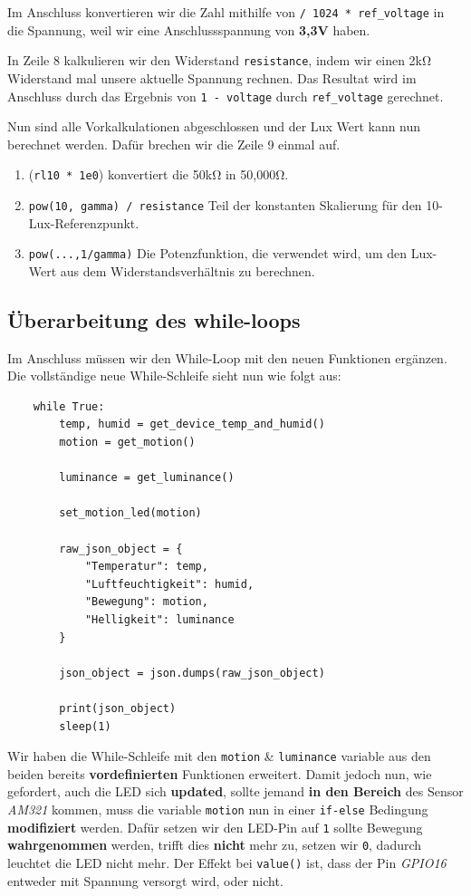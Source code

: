\documentclass[9pt,a4paper]{report}
\begin{document}
	Im Anschluss konvertieren wir die Zahl mithilfe von \texttt{/ 1024 * ref\_voltage} in die Spannung, weil wir eine Anschlussspannung von \textbf{3,3V} haben.
	
	In Zeile 8 kalkulieren wir den Widerstand \texttt{resistance}, indem wir einen 2kΩ Widerstand mal unsere aktuelle Spannung rechnen. Das Resultat wird im Anschluss durch das Ergebnis von \texttt{1 - voltage} durch \texttt{ref\_voltage} gerechnet.
	
	Nun sind alle Vorkalkulationen abgeschlossen und der Lux Wert kann nun berechnet werden. Dafür brechen wir die Zeile 9 einmal auf.
	
	\begin{enumerate}
		\item (\texttt{rl10 * 1e0}) konvertiert die 50kΩ in 50,000Ω.
		\item  \texttt{pow(10, gamma) / resistance} Teil der konstanten Skalierung für den 10-Lux-Referenzpunkt.
		\item \texttt{pow(...,1/gamma)} Die Potenzfunktion, die verwendet wird, um den Lux-Wert aus dem Widerstandsverhältnis zu berechnen.
	\end{enumerate}
	
	\subsection{Überarbeitung des while-loops}
	Im Anschluss müssen wir den While-Loop mit den neuen Funktionen ergänzen.
	Die vollständige neue While-Schleife sieht nun wie folgt aus:
	\begin{lstlisting}
	while True:	
		temp, humid = get_device_temp_and_humid()
		motion = get_motion()
	
		luminance = get_luminance()
	
		set_motion_led(motion)
	
		raw_json_object = {
			"Temperatur": temp,
			"Luftfeuchtigkeit": humid,
			"Bewegung": motion,
			"Helligkeit": luminance
		}
	
		json_object = json.dumps(raw_json_object)
	
		print(json_object)
		sleep(1)
	\end{lstlisting}
	Wir haben die While-Schleife mit den \texttt{motion} \& \texttt{luminance} variable aus den beiden bereits \textbf{vordefinierten} Funktionen erweitert.
	Damit jedoch nun, wie gefordert, auch die LED sich \textbf{updated}, sollte jemand \textbf{in den Bereich} des Sensor \textit{AM321} kommen, muss die variable \texttt{motion} nun in einer \texttt{if-else} Bedingung \textbf{modifiziert} werden.
	Dafür setzen wir den LED-Pin auf \texttt{1} sollte Bewegung \textbf{wahrgenommen} werden, trifft dies \textbf{nicht} mehr zu, setzen wir \texttt{0}, dadurch leuchtet die LED nicht mehr. Der Effekt bei \texttt{value()} ist, dass der Pin \textit{GPIO16} entweder mit Spannung versorgt wird, oder nicht.
	\newpage
	
\end{document}
